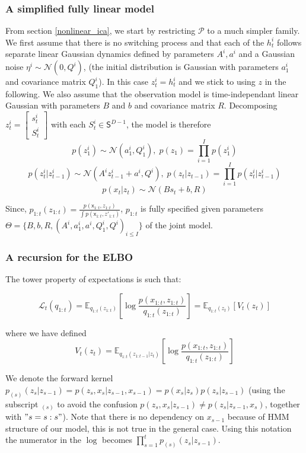 \documentclass{article}
\newcommand{\1}{\mathbbm{1}}
\newcommand{\eqsp}{\;}
\newcommand{\expect}[2]{\mathbb{E}_{#1}\left[#2\right]}
\newcommand{\gaussian}[2]{\mathcal{N}\left( #1, #2 \right)}
\begin{document}
\subsubsection*{A simplified fully linear model}
From section \ref{nonlinear_ica}, we start by restricting $\mathcal{P}$ to a much simpler family. We first assume that there is no switching process and that each of the $h_t^i$ follows separate linear Gaussian dynamics defined by parameters $A^i,a^i$ and a Gaussian noise $\eta^i \sim \gaussian{0}{Q^i}$, (the initial distribution is Gaussian with parameters $a_1^i$ and covariance matrix $Q_1^i$). In this case $z_t^i = h_t^i$ and we stick to using $z$ in the following. We also assume that the observation model is time-independant linear Gaussian with parameters $B$ and $b$ and covariance matrix $R$.
Decomposing $z_t^i = \begin{bmatrix}
    s_t^i \\
    S_t^i
    \end{bmatrix}$ 
with each $S_t^i \in \mathsf{S}^{D-1}$, the model is therefore
$$p(z_1^i) \sim \gaussian{a_1^i}{Q_1^i}, \eqsp p(z_1) = \prod_{i=1}^I p(z_1^i)$$
$$p(z_t^i|z_{t-1}^i) \sim \gaussian{A^i z_{t-1}^i + a^i}{Q^i}, \eqsp p(z_t|z_{t-1}) = \prod_{i=1}^I p(z_t^i|z_{t-1}^i)$$
$$p(x_t|z_t) \sim \gaussian{B s_t + b}{R}$$

Since, $p_{1:t}( z_{1:t}) = \frac{p(\mathsf{x}_{1:t},  z_{1:t})}{\int p(\mathsf{x}_{1:t},  z'_{1:t})}$, $p_{1:t}$ is fully specified given parameters $\Theta = \{B, b, R, (A^i, a_1^i, a^i, Q_1^i, Q^i)_{i \leq I}\}$ of the joint model. 
\subsubsection*{A recursion for the ELBO}
The tower property of expectations is such that: 

\begin{equation}
    \mathcal{L}_t(q_{1:t}) = \expect{q_{1:t}( z_{1:t})}{\log \frac{p(x_{1:t},z_{1:t})}{q_{1:t}(z_{1:t})}} = \expect{q_{1:t}( z_t)}{V_t(z_{t})}
\end{equation}

where we have defined $$V_t(z_t) = \expect{q_{1:t}( z_{1:t-1}|z_t)}{\log \frac{p(x_{1:t},z_{1:t})}{q_{1:t}(z_{1:t})}}$$

We denote the forward kernel $p_{(s)}(z_s|z_{s-1}) = p(z_s,x_s|z_{s-1}, x_{s-1}) = p(x_s|z_s)p(z_s|z_{s-1})$ (using the subscript $_{(s)}$ to avoid the confusion $p(z_s,x_s|z_{s-1}) \neq p(z_s|z_{s-1},x_s)$, together with $"s = s:s"$). Note that there is no dependency on $x_{s-1}$ because of HMM structure of our model, this is not true in the general case. Using this notation the numerator in the $\log$ becomes $\prod_{s=1}^t p_{(s)}( z_s|z_{s-1})$. 
\end{document}
